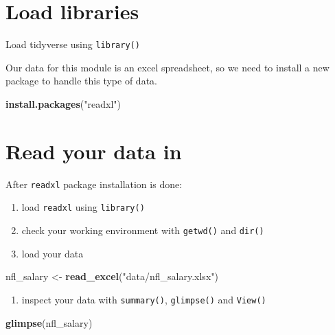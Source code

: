 \documentclass[
]{book}
\newenvironment{Shaded}{\begin{snugshade}}{\end{snugshade}}
\newcommand{\KeywordTok}[1]{\textcolor[rgb]{0.13,0.29,0.53}{\textbf{#1}}}
\newcommand{\NormalTok}[1]{#1}
\newcommand{\StringTok}[1]{\textcolor[rgb]{0.31,0.60,0.02}{#1}}
\providecommand{\tightlist}{%
  \setlength{\itemsep}{0pt}\setlength{\parskip}{0pt}}
\begin{document}
\hypertarget{load-libraries}{%
\section{Load libraries}\label{load-libraries}}

Load tidyverse using \texttt{library()}

Our data for this module is an excel spreadsheet, so we need to install a new package to handle this type of data.

\begin{Shaded}
\begin{Highlighting}[]
\KeywordTok{install.packages}\NormalTok{(}\StringTok{"readxl"}\NormalTok{)}
\end{Highlighting}
\end{Shaded}

\hypertarget{read-your-data-in}{%
\section{Read your data in}\label{read-your-data-in}}

After \texttt{readxl} package installation is done:

\begin{enumerate}
\def\labelenumi{\arabic{enumi}.}
\item
  load \texttt{readxl} using \texttt{library()}
\item
  check your working environment with \texttt{getwd()} and \texttt{dir()}
\item
  load your data
\end{enumerate}

\begin{Shaded}
\begin{Highlighting}[]
\NormalTok{nfl_salary <-}\StringTok{ }\KeywordTok{read_excel}\NormalTok{(}\StringTok{"data/nfl_salary.xlsx"}\NormalTok{)}
\end{Highlighting}
\end{Shaded}

\begin{enumerate}
\def\labelenumi{\arabic{enumi}.}
\setcounter{enumi}{3}
\tightlist
\item
  inspect your data with \texttt{summary()}, \texttt{glimpse()} and \texttt{View()}
\end{enumerate}

\begin{Shaded}
\begin{Highlighting}[]
\KeywordTok{glimpse}\NormalTok{(nfl_salary)}
\end{Highlighting}
\end{Shaded}
\end{document}

